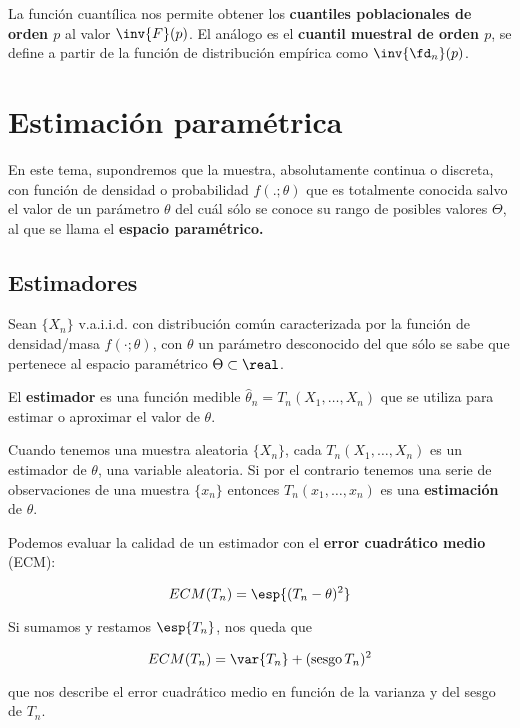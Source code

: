 \documentclass{apuntes}
\begin{document}
La función cuantílica nos permite obtener los \textbf{cuantiles poblacionales de orden $p$}  al valor $\inv{F}(p)$. El análogo es el \textbf{cuantil muestral de orden $p$},  se define a partir de la función de distribución empírica como $\inv{\fd_n}(p)$.

\chapter{Estimación paramétrica}

En este tema, supondremos que la muestra, absolutamente continua o discreta, con función de densidad o probabilidad $f(.;\theta)$ que es totalmente conocida salvo el valor de un parámetro $\theta$ del cuál sólo se conoce su rango de posibles valores $\Theta$, al que se llama el \textbf{espacio paramétrico.}

\section{Estimadores}

\begin{defn}[Estimador] Sean $\{X_n\}$ v.a.i.i.d. con distribución común caracterizada por la función de densidad/masa $f(\cdot;\theta)$, con $\theta$ un parámetro desconocido del que sólo se sabe que pertenece al espacio paramétrico $\Theta \subset \real$.

El \textbf{estimador} es una función medible $\hat{\theta}_n = T_n(X_1,\dotsc, X_n)$ que se utiliza para estimar o aproximar el valor de $\theta$.
\end{defn}

Cuando tenemos una muestra aleatoria $\{X_n\}$, cada $T_n(X_1, \dotsc, X_n)$ es un estimador de $\theta$, una variable aleatoria. Si por el contrario tenemos una serie de observaciones de una muestra $\{x_n\}$ entonces $T_n(x_1,\dotsc,x_n)$ es una \textbf{estimación} de $\theta$.

Podemos evaluar la calidad de un estimador con el \textbf{error cuadrático medio} (ECM):

\[ ECM(T_n) = \esp{(T_n - \theta)^2}\]

Si sumamos y restamos $\esp{T_n}$, nos queda que 

\[ ECM(T_n) = \var{T_n} + (\text{sesgo}\, T_n)^2 \]

que nos describe el error cuadrático medio en función de la varianza y del sesgo de $T_n$.
\end{document}
